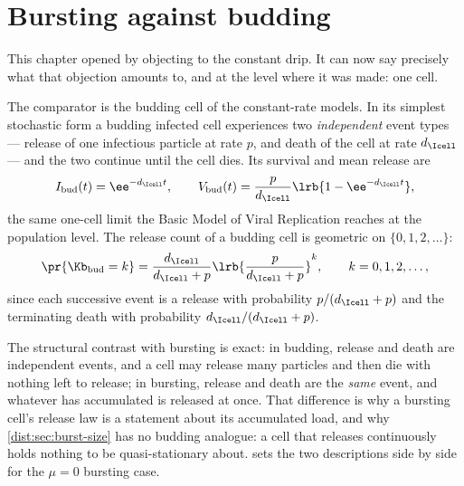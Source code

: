 \section{Bursting against budding}
\label{dist:sec:budding}

This chapter opened by objecting to the constant drip. It can now say
precisely what that objection amounts to, and at the level where it was made:
one cell.

The comparator is the budding cell of the constant-rate models. In its
simplest stochastic form a budding infected cell experiences two
\emph{independent} event types --- release of one infectious particle at rate
$p$, and death of the cell at rate $d_{\Icell}$ --- and the two continue until
the cell dies. Its survival and mean release are
\begin{equation}
I_{\rm bud}(t)=\ee^{-d_{\Icell}t},\qquad
V_{\rm bud}(t)=\frac{p}{d_{\Icell}}\lrb{1-\ee^{-d_{\Icell}t}},
\label{dist:eq:bud}
\end{equation}
the same one-cell limit the Basic Model of Viral Replication reaches at the
population level. The release count of a budding cell is geometric on
$\{0,1,2,\ldots\}$:
\begin{equation}
\pr{\Kb_{\rm bud}=k}=\frac{d_{\Icell}}{d_{\Icell}+p}
\lrb{\frac{p}{d_{\Icell}+p}}^k,\qquad k=0,1,2,\ldots,
\label{dist:eq:budgeom}
\end{equation}
since each successive event is a release with probability
$p/(d_{\Icell}+p)$ and the terminating death with probability
$d_{\Icell}/(d_{\Icell}+p)$.

The structural contrast with bursting is exact: in budding, release and death
are independent events, and a cell may release many particles and then die
with nothing left to release; in bursting, release and death are the
\emph{same} event, and whatever has accumulated is released at once. That
difference is why a bursting cell's release law is a statement about its
accumulated load, and why \cref{dist:sec:burst-size} has no budding analogue:
a cell that releases continuously holds nothing to be quasi-stationary about.
 sets the two descriptions side by side for the
$\mu=0$ bursting case.

